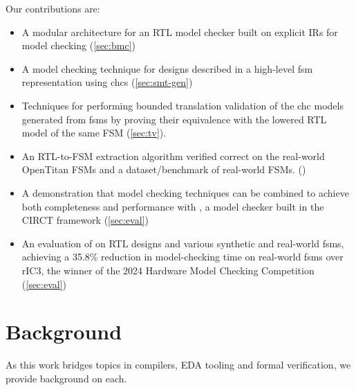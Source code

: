 \documentclass[acmsmall,screen,review]{acmart}
\begin{document}
\vspace{.5em}
\noindent
Our contributions are:
\begin{itemize}
  \item A modular architecture for an RTL model checker built on explicit IRs for model checking (\autoref{sec:bmc})
  \item A model checking technique for designs described in a high-level \ac{fsm} representation using \acp{chc} (\autoref{sec:smt-gen})
  \item Techniques for performing bounded translation validation of the \ac{chc} models generated from \acp{fsm} by proving their equivalence with the lowered RTL model of the same FSM (\autoref{sec:tv}).
  \item An RTL-to-FSM extraction algorithm verified correct on the real-world OpenTitan FSMs and a dataset/benchmark of real-world FSMs. ()
  \item A demonstration that model checking techniques can be combined to achieve both completeness and performance with \toolname{}, a model checker built in the CIRCT framework (\autoref{sec:eval})
  \item An evaluation of \toolname{} on RTL designs and various synthetic and real-world \acp{fsm}, achieving a 35.8\% reduction in model-checking time on real-world \acp{fsm} over rIC3, the winner of the 2024 Hardware Model Checking Competition (\autoref{sec:eval})
\end{itemize}

\acresetall

\section{Background}
As this work bridges topics in compilers, EDA tooling and formal verification,
we provide background on each.
\end{document}
